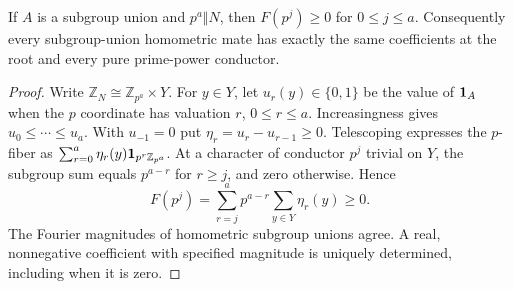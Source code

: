 \begin{lemma}\label{ii:lem:pure}
If $A$ is a subgroup union and $p^a\Vert N$, then $F(p^j)\ge0$ for $0\le j\le a$.  Consequently every subgroup-union homometric mate has exactly the same coefficients at the root and every pure prime-power conductor.
\end{lemma}
\begin{proof}
Write $\mathbb Z_N\cong\mathbb Z_{p^a}\times Y$.  For $y\in Y$, let $u_r(y)\in\{0,1\}$ be the value of $\mathbf 1_A$ when the $p$ coordinate has valuation $r$, $0\le r\le a$.  Increasingness gives $u_0\le\cdots\le u_a$.  With $u_{-1}=0$ put $\eta_r=u_r-u_{r-1}\ge0$.  Telescoping expresses the $p$-fiber as $\sum_{r=0}^a\eta_r(y)\mathbf 1_{p^r\mathbb Z_{p^a}}$.  At a character of conductor $p^j$ trivial on $Y$, the subgroup sum equals $p^{a-r}$ for $r\ge j$, and zero otherwise.  Hence
\[
 F(p^j)=\sum_{r=j}^a p^{a-r}\sum_{y\in Y}\eta_r(y)\ge0.
\]
The Fourier magnitudes of homometric subgroup unions agree.  A real, nonnegative coefficient with specified magnitude is uniquely determined, including when it is zero.\qedhere
\end{proof}

